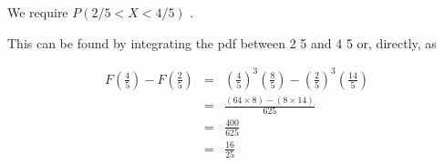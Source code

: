 \documentclass[a4paper,12pt]{article}
\begin{document}
\begin{enumerate}
We require  $P(2/5 < X < 4/5)$ .

This can be found by integrating the pdf between 2
5 and 4
5 or, directly, as

\begin{eqnarray*}
F\left(\frac{4}{5}\right) - F\left(\frac{2}{5}\right) &=& \left(\frac{4}{5}\right)^3\left(\frac{8}{5}\right) - \left(\frac{2}{5}\right)^3\left(\frac{14}{5}\right)\\
&=& \frac{(64 \times 8) - (8 \times 14)}{625} \\
&=& \frac{400}{625} \\
&=& \frac{16}{25}
\end{eqnarray*}

\end{enumerate}
\end{document}
